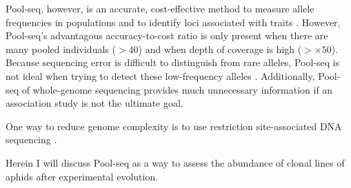 Pool-seq, however, is an accurate, cost-effective method to measure allele frequencies
in populations \citep{Gautier:2013dv,Futschik:2010be}
and to identify loci associated with traits \citep{Rubin:2010es,Bastide:2013jx}.
However, Pool-seq's advantagous accuracy-to-cost ratio is only present when there
are many pooled individuals ($>40$) and when depth of coverage is high ($> \times 50$).
Because sequencing error is difficult to distinguish from rare alleles, 
Pool-seq is not ideal when trying to detect these low-frequency alleles
\citep{Schlotterer:2014dk}.
Additionally, Pool-seq of whole-genome sequencing provides much unnecessary 
information if an association study is not the ultimate goal.

One way to reduce genome complexity is to use restriction site-associated DNA 
sequencing \citep[``RADseq'';][]{Andrews:2016bc}.



Herein I will discuss Pool-seq as a way to assess the abundance of clonal lines of
aphids after experimental evolution.







\iffalse
\cite{Kofler:2011ds}

\citep{Elena:2003fr}

\citep{Schlotterer:2014jza}

\citep{Dettman:2012gt}




\citep{Jerison:2015kw}



\citep{Blount:2008fo}
\citep{Barrick:2009in}



\citep{TollRiera:2016fd}

\citep{Voordeckers:2015cl}

